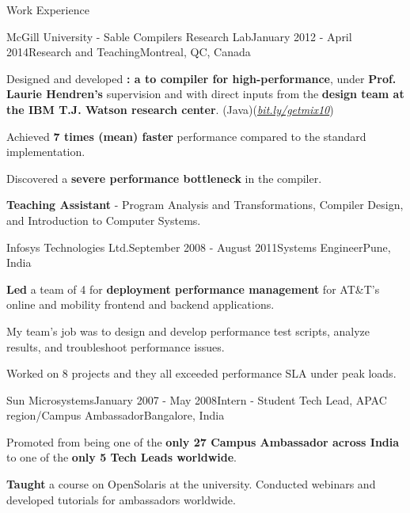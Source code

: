 \documentclass{resume} %
\begin{document}
\begin{rSection}{Work Experience}
\begin{rSubsection}{McGill University - Sable Compilers Research Lab}{January
        2012 - April 2014}{Research and Teaching}{Montreal, QC, Canada}
\begin{lsubSubsection}
\item Designed and developed \textbf{\mixtenx: a \matlab to \xten  compiler for
        high-performance}, under \textbf{Prof. Laurie Hendren's} supervision
        and with direct inputs from the \textbf{\xten design team at the IBM
        T.J. Watson research center}.
        (Java)(\href{http://bit.ly/getmix10}{\em{bit.ly/getmix10}})  
 \item Achieved \textbf{7 times (mean) faster} performance compared to the
 standard \matlab implementation.
  \item Discovered a \textbf{severe performance bottleneck}
in the \xten compiler.  
\end{lsubSubsection}
\item \textbf{Teaching Assistant} - Program Analysis and Transformations,
	Compiler Design, and Introduction to Computer Systems.
\end{rSubsection}

\begin{rSubsection}{Infosys Technologies Ltd.}{September 2008 - August
        2011}{Systems Engineer}{Pune, India}
\item \textbf{Led} a team of 4 for \textbf{deployment performance management}
	for AT\&T's online and mobility frontend and backend applications.
\begin{lsubSubsection}
\item My team's job was to design and develop performance test scripts, analyze
	results, and troubleshoot performance issues.  
\item {Worked on 8 projects} and they all exceeded performance SLA under peak
	loads.
\end{lsubSubsection}
\end{rSubsection}

\begin{rSubsection}{Sun Microsystems}{January 2007 - May 2008}{Intern - Student
        Tech Lead, APAC region/Campus Ambassador}{Bangalore, India}
\item Promoted from being one of the \textbf{only 27 Campus Ambassador across
	India} to one of the \textbf{only 5 Tech Leads worldwide}.  
\begin{lsubSubsection}
\item \textbf{Taught} a course on OpenSolaris at the university. Conducted
	webinars and developed tutorials for ambassadors worldwide.
\end{lsubSubsection}
\end{rSubsection}
\end{rSection}
\end{document}
